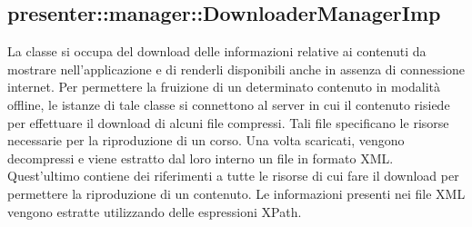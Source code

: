 \documentclass[../Tesi.tex]{subfiles}
\begin{document}
		\subsection{presenter::manager::DownloaderManagerImp}
		La classe  si occupa del download delle informazioni relative ai contenuti da mostrare nell'applicazione e di renderli disponibili anche in assenza di connessione internet. Per permettere la fruizione di un determinato contenuto in modalità offline, le istanze di tale classe si connettono al server in cui il contenuto risiede per effettuare il download di alcuni file compressi. Tali file specificano le risorse necessarie per la riproduzione di un corso. Una volta scaricati, vengono decompressi e viene estratto dal loro interno un file in formato XML. Quest'ultimo contiene dei riferimenti a tutte le risorse di cui fare il download per permettere la riproduzione di un contenuto. Le informazioni presenti nei file XML vengono estratte utilizzando delle espressioni XPath.
\end{document}
